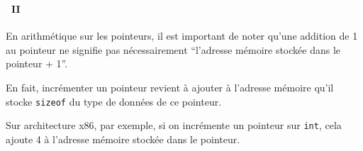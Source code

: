 \begin{frame}[containsverbatim]
  \frametitle{\secname}
  \framesubtitle{\subsecname~II}

  En arithmétique sur les pointeurs, il est important de noter qu'une addition de 1 au pointeur ne signifie pas nécessairement 
  ``l'adresse mémoire stockée dans le pointeur + 1''. 
  \par
  En fait, incrémenter un pointeur revient à ajouter à l'adresse mémoire qu'il stocke \texttt{sizeof} du type de données de ce pointeur.
  \vspace{0.3cm}
  \par
  Sur architecture x86, par exemple, si on incrémente un pointeur sur \texttt{int}, cela ajoute 4 à l'adresse mémoire stockée dans le
  pointeur.
\end{frame}  

